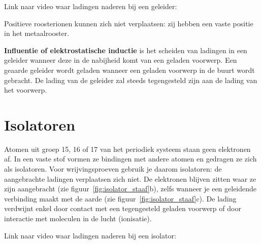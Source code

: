 \documentclass{ximera}
\begin{document}
\begin{onlineOnly}
    Link naar video waar ladingen naderen bij een geleider: 
\end{onlineOnly}

\begin{remark}
Positieve roosterionen kunnen zich niet verplaatsen: zij hebben een vaste positie in het metaalrooster.
\end{remark}

\begin{definition}[expandable=true,title={Influentie of elektrostatische inductie}]\nl
    \textbf{Influentie of elektrostatische inductie} is het scheiden van ladingen in een geleider wanneer deze in de nabijheid komt van een geladen voorwerp.
    Een geaarde geleider wordt geladen wanneer een geladen voorwerp in de buurt wordt gebracht. De lading van de geleider zal steeds tegengesteld zijn aan de lading van het voorwerp.
\end{definition}

\section{Isolatoren}

Atomen uit groep 15, 16 of 17 van het periodiek systeem staan geen elektronen af. In een vaste stof vormen ze bindingen met andere atomen en gedragen ze zich als isolatoren. Voor wrijvingsproeven gebruik je daarom isolatoren: de aangebrachte ladingen verplaatsen zich niet. De elektronen blijven zitten waar ze zijn aangebracht (zie figuur~\ref{fig:isolator_staaf}b), zelfs wanneer je een geleidende verbinding maakt met de aarde (zie figuur~\ref{fig:isolator_staaf}c). De lading verdwijnt enkel door contact met een tegengesteld geladen voorwerp of door interactie met moleculen in de lucht (ionisatie).

\begin{onlineOnly}
    Link naar video waar ladingen naderen bij een isolator: 
\end{onlineOnly}
\end{document}
